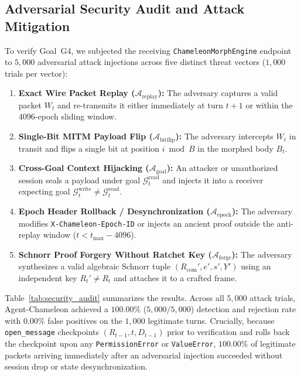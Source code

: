 \documentclass[conference,10pt]{IEEEtran}
\begin{document}
\subsection{Adversarial Security Audit and Attack Mitigation}
To verify Goal~G4, we subjected the receiving \texttt{ChameleonMorphEngine} endpoint to $5{,}000$ adversarial attack injections across five distinct threat vectors ($1{,}000$ trials per vector):
\begin{enumerate}
    \item \textbf{Exact Wire Packet Replay ($\mathcal{A}_{\text{replay}}$):} The adversary captures a valid packet $W_t$ and re-transmits it either immediately at turn $t+1$ or within the 4096-epoch sliding window.
    \item \textbf{Single-Bit MITM Payload Flip ($\mathcal{A}_{\text{bitflip}}$):} The adversary intercepts $W_t$ in transit and flips a single bit at position $i \bmod B$ in the morphed body $B_t$.
    \item \textbf{Cross-Goal Context Hijacking ($\mathcal{A}_{\text{goal}}$):} An attacker or unauthorized session seals a payload under goal $\mathcal{G}_t^{\text{read}}$ and injects it into a receiver expecting goal $\mathcal{G}_t^{\text{write}} \ne \mathcal{G}_t^{\text{read}}$.
    \item \textbf{Epoch Header Rollback / Desynchronization ($\mathcal{A}_{\text{epoch}}$):} The adversary modifies \texttt{X-Chameleon-Epoch-ID} or injects an ancient proof outside the anti-replay window ($t < t_{\max} - 4096$).
    \item \textbf{Schnorr Proof Forgery Without Ratchet Key ($\mathcal{A}_{\text{forge}}$):} The adversary synthesizes a valid algebraic Schnorr tuple $(R_{\text{com}}', e', s', Y')$ using an independent key $R_t' \ne R_t$ and attaches it to a crafted frame.
\end{enumerate}

Table~\ref{tab:security_audit} summarizes the results. Across all $5{,}000$ attack trials, Agent-Chameleon achieved a $100.00\%$ ($5{,}000 / 5{,}000$) detection and rejection rate with $0.00\%$ false positives on the $1{,}000$ legitimate turns. Crucially, because \texttt{open\_message} checkpoints $(R_{t-1}, t, D_{t-1})$ prior to verification and rolls back the checkpoint upon any \texttt{PermissionError} or \texttt{ValueError}, $100.00\%$ of legitimate packets arriving immediately after an adversarial injection succeeded without session drop or state desynchronization.
\end{document}
